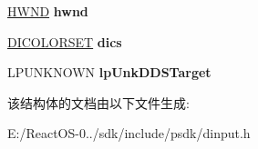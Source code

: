 \begin{DoxyCompactItemize}
\hyperlink{interfacevoid}{H\+W\+ND} {\bfseries hwnd}
\item 
\mbox{\label{struct___d_i_c_o_n_f_i_g_u_r_e_d_e_v_i_c_e_s_p_a_r_a_m_s_w_aa7c3fc5219fca7fb4d3a1492895960d3}} 
\hyperlink{struct___d_i_c_o_l_o_r_s_e_t}{D\+I\+C\+O\+L\+O\+R\+S\+ET} {\bfseries dics}
\item 
\mbox{\label{struct___d_i_c_o_n_f_i_g_u_r_e_d_e_v_i_c_e_s_p_a_r_a_m_s_w_afff71aea93a919a6739a93d0ebc51011}} 
L\+P\+U\+N\+K\+N\+O\+WN {\bfseries lp\+Unk\+D\+D\+S\+Target}
\end{DoxyCompactItemize}


该结构体的文档由以下文件生成\+:\begin{DoxyCompactItemize}
\item 
E\+:/\+React\+O\+S-\/0../sdk/include/psdk/dinput.\+h\end{DoxyCompactItemize}
